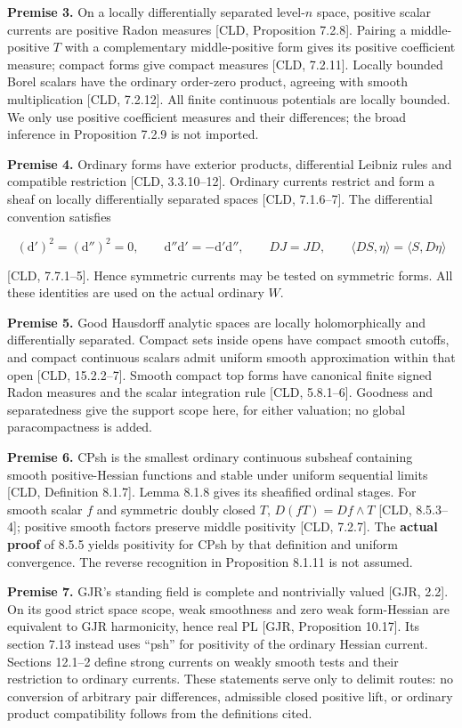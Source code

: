 \documentclass[
  11pt,
]{article}
\begin{document}
\textbf{Premise 3.} On a locally differentially separated level-\(n\)
space, positive scalar currents are positive Radon measures {[}CLD,
Proposition 7.2.8{]}. Pairing a middle-positive \(T\) with a
complementary middle-positive form gives its positive coefficient
measure; compact forms give compact measures {[}CLD, 7.2.11{]}. Locally
bounded Borel scalars have the ordinary order-zero product, agreeing
with smooth multiplication {[}CLD, 7.2.12{]}. All finite continuous
potentials are locally bounded. We only use positive coefficient
measures and their differences; the broad inference in Proposition 7.2.9
is not imported.

\textbf{Premise 4.} Ordinary forms have exterior products, differential
Leibniz rules and compatible restriction {[}CLD, 3.3.10--12{]}. Ordinary
currents restrict and form a sheaf on locally differentially separated
spaces {[}CLD, 7.1.6--7{]}. The differential convention satisfies

\[
(\mathrm d')^2=(\mathrm d'')^2=0,\qquad
\mathrm d''\mathrm d'=-\mathrm d'\mathrm d'',\qquad DJ=JD,
\qquad \langle DS,\eta\rangle=\langle S,D\eta\rangle
\]

{[}CLD, 7.7.1--5{]}. Hence symmetric currents may be tested on symmetric
forms. All these identities are used on the actual ordinary \(W\).

\textbf{Premise 5.} Good Hausdorff analytic spaces are locally
holomorphically and differentially separated. Compact sets inside opens
have compact smooth cutoffs, and compact continuous scalars admit
uniform smooth approximation within that open {[}CLD, 15.2.2--7{]}.
Smooth compact top forms have canonical finite signed Radon measures and
the scalar integration rule {[}CLD, 5.8.1--6{]}. Goodness and
separatedness give the support scope here, for either valuation; no
global paracompactness is added.

\textbf{Premise 6.} CPsh is the smallest ordinary continuous subsheaf
containing smooth positive-Hessian functions and stable under uniform
sequential limits {[}CLD, Definition 8.1.7{]}. Lemma 8.1.8 gives its
sheafified ordinal stages. For smooth scalar \(f\) and symmetric doubly
closed \(T\), \(D(fT)=Df\wedge T\) {[}CLD, 8.5.3--4{]}; positive smooth
factors preserve middle positivity {[}CLD, 7.2.7{]}. The \textbf{actual
proof} of 8.5.5 yields positivity for CPsh by that definition and
uniform convergence. The reverse recognition in Proposition 8.1.11 is
not assumed.

\textbf{Premise 7.} GJR's standing field is complete and nontrivially
valued {[}GJR, 2.2{]}. On its good strict space scope, weak smoothness
and zero weak form-Hessian are equivalent to GJR harmonicity, hence real
PL {[}GJR, Proposition 10.17{]}. Its section 7.13 instead uses ``psh''
for positivity of the ordinary Hessian current. Sections 12.1--2 define
strong currents on weakly smooth tests and their restriction to ordinary
currents. These statements serve only to delimit routes: no conversion
of arbitrary pair differences, admissible closed positive lift, or
ordinary product compatibility follows from the definitions cited.
\end{document}
